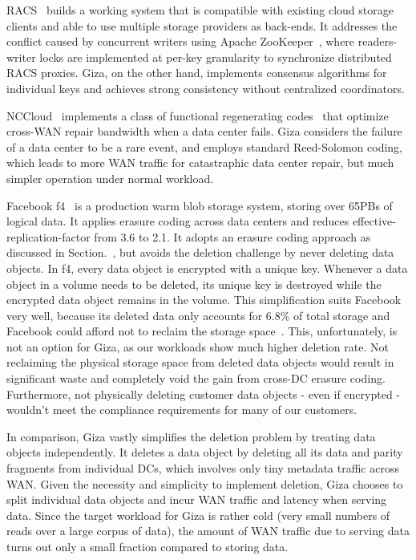 RACS~\cite{Abu-Libdeh:2010:RCC:1807128.1807165} 
builds a working system that is compatible with existing cloud storage clients and able to use multiple storage providers as back-ends.
It addresses the conflict caused by concurrent writers using Apache ZooKeeper~\cite{zookeeper}, where readers-writer locks are implemented at per-key granularity to synchronize distributed RACS proxies.
Giza, on the other hand, implements consensus algorithms for individual keys and achieves strong consistency without centralized coordinators.

NCCloud~\cite{hu2012nccloud} implements a class of functional regenerating codes~\cite{Dimakis07networkcoding} that optimize cross-WAN repair bandwidth when a data center fails. Giza considers the failure of a data center to be a rare event, and employs standard Reed-Solomon coding, which leads to more WAN traffic for catastraphic data center repair, but much simpler operation under normal workload.

Facebook f4~\cite{muralidhar2014f4} is a production warm blob storage system, storing over 65PBs of logical data. It applies erasure coding across data centers and reduces effective-replication-factor from 3.6 to 2.1. 
It adopts an erasure coding approach as discussed in Section.~\cite{sec:alternative}, but avoids the deletion challenge by never deleting data objects. In f4, every data object is encrypted with a unique key. Whenever a data object in a volume needs to be deleted, its unique key is destroyed while the encrypted data object remains in the volume. This simplification suits Facebook very well, because its deleted data only accounts for $6.8\%$ of total storage and Facebook could afford not to reclaim the storage space~\cite{muralidhar2014f4}. This, unfortunately, is not an option for Giza, as our workloads show much higher deletion rate. Not reclaiming the physical storage space from deleted data objects would result in significant waste and completely void the gain from cross-DC erasure coding. Furthermore, not physically deleting customer data objects - even if encrypted - wouldn't meet the compliance requirements for many of our customers.

In comparison, Giza vastly simplifies the deletion problem by treating data objects independently. It deletes a data object by deleting all its data and parity fragments from individual DCs, which involves only tiny metadata traffic across WAN.
Given the necessity and simplicity to implement deletion, Giza chooses to split individual data objects and incur WAN traffic and latency when serving data. Since the target workload for Giza is rather cold (very small numbers of reads over a large corpus of data), the amount of WAN traffic due to serving data turns out only a small fraction compared to storing data.

